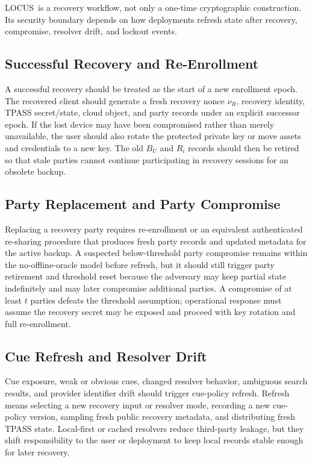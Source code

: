 \documentclass[sigconf,anonymous]{acmart}
\newcommand{\LOCUS}{\textsf{LOCUS}}
\begin{document}
\LOCUS\ is a recovery workflow, not only a one-time cryptographic construction. Its security boundary depends on how deployments refresh state after recovery, compromise, resolver drift, and lockout events.

\subsection{Successful Recovery and Re-Enrollment}

A successful recovery should be treated as the start of a new enrollment epoch. The recovered client should generate a fresh recovery nonce \(\nu_R\), recovery identity, TPASS secret/state, cloud object, and party records under an explicit successor epoch. If the lost device may have been compromised rather than merely unavailable, the user should also rotate the protected private key or move assets and credentials to a new key. The old \(B_U\) and \(R_i\) records should then be retired so that stale parties cannot continue participating in recovery sessions for an obsolete backup.

\subsection{Party Replacement and Party Compromise}

Replacing a recovery party requires re-enrollment or an equivalent authenticated re-sharing procedure that produces fresh party records and updated metadata for the active backup. A suspected below-threshold party compromise remains within the no-offline-oracle model before refresh, but it should still trigger party retirement and threshold reset because the adversary may keep partial state indefinitely and may later compromise additional parties. A compromise of at least \(t\) parties defeats the threshold assumption; operational response must assume the recovery secret may be exposed and proceed with key rotation and full re-enrollment.

\subsection{Cue Refresh and Resolver Drift}

Cue exposure, weak or obvious cues, changed resolver behavior, ambiguous search results, and provider identifier drift should trigger cue-policy refresh. Refresh means selecting a new recovery input or resolver mode, recording a new cue-policy version, sampling fresh public recovery metadata, and distributing fresh TPASS state. Local-first or cached resolvers reduce third-party leakage, but they shift responsibility to the user or deployment to keep local records stable enough for later recovery.
\end{document}
